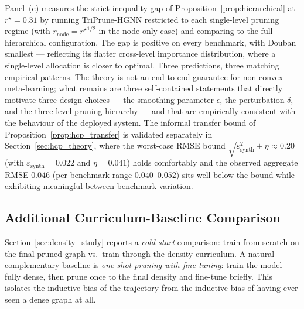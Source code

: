 \documentclass[10pt]{article}
\theoremstyle{plain}
\theoremstyle{definition}
\begin{document}
Panel~(c) measures the strict-inequality gap of Proposition~\ref{prop:hierarchical} at $r^{\star}\!=\!0.31$ by running TriPrune-HGNN restricted to each single-level pruning regime (with $r_{\mathrm{node}}\!=\!{r^{\star}}^{1/2}$ in the node-only case) and comparing to the full hierarchical configuration. The gap is positive on every benchmark, with Douban smallest --- reflecting its flatter cross-level importance distribution, where a single-level allocation is closer to optimal. Three predictions, three matching empirical patterns. The theory is not an end-to-end guarantee for non-convex meta-learning; what remains are three self-contained statements that directly motivate three design choices --- the smoothing parameter $\epsilon$, the perturbation $\delta$, and the three-level pruning hierarchy --- and that are empirically consistent with the behaviour of the deployed system. The informal transfer bound of Proposition~\ref{prop:hcp_transfer} is validated separately in Section~\ref{sec:hcp_theory}, where the worst-case RMSE bound $\sqrt{\varepsilon_{\mathrm{synth}}^{2}+\eta}\!\approx\!0.20$ (with $\varepsilon_{\mathrm{synth}}=0.022$ and $\eta=0.041$) holds comfortably and the observed aggregate RMSE $0.046$ (per-benchmark range $0.040$--$0.052$) sits well below the bound while exhibiting meaningful between-benchmark variation.

\subsection{Additional Curriculum-Baseline Comparison}
\label{sec:additional_curriculum_baselines}

Section~\ref{sec:density_study} reports a \emph{cold-start} comparison: train from scratch on the final pruned graph vs.\ train through the density curriculum. A natural complementary baseline is \emph{one-shot pruning with fine-tuning}: train the model fully dense, then prune once to the final density and fine-tune briefly. This isolates the inductive bias of the trajectory from the inductive bias of having ever seen a dense graph at all.
\end{document}
